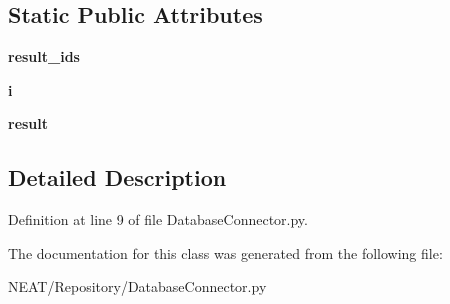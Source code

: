 \subsection*{Static Public Attributes}
\begin{DoxyCompactItemize}
\item 
{\bfseries result\+\_\+ids}\hypertarget{class_n_e_a_t___py_genetics_1_1_n_e_a_t_1_1_repository_1_1_database_connector_1_1_database_connector_ae6a5bd1fe8b17e6f4daeb34016befacc}{}\label{class_n_e_a_t___py_genetics_1_1_n_e_a_t_1_1_repository_1_1_database_connector_1_1_database_connector_ae6a5bd1fe8b17e6f4daeb34016befacc}

\item 
{\bfseries i}\hypertarget{class_n_e_a_t___py_genetics_1_1_n_e_a_t_1_1_repository_1_1_database_connector_1_1_database_connector_aa64c3cdec4a68d8b9cb70eff5fc65da1}{}\label{class_n_e_a_t___py_genetics_1_1_n_e_a_t_1_1_repository_1_1_database_connector_1_1_database_connector_aa64c3cdec4a68d8b9cb70eff5fc65da1}

\item 
{\bfseries result}\hypertarget{class_n_e_a_t___py_genetics_1_1_n_e_a_t_1_1_repository_1_1_database_connector_1_1_database_connector_ac4e5c7484ac4c90604a438b88250f4cc}{}\label{class_n_e_a_t___py_genetics_1_1_n_e_a_t_1_1_repository_1_1_database_connector_1_1_database_connector_ac4e5c7484ac4c90604a438b88250f4cc}

\end{DoxyCompactItemize}


\subsection{Detailed Description}


Definition at line 9 of file Database\+Connector.\+py.



The documentation for this class was generated from the following file\+:\begin{DoxyCompactItemize}
\item 
N\+E\+A\+T/\+Repository/Database\+Connector.\+py\end{DoxyCompactItemize}
